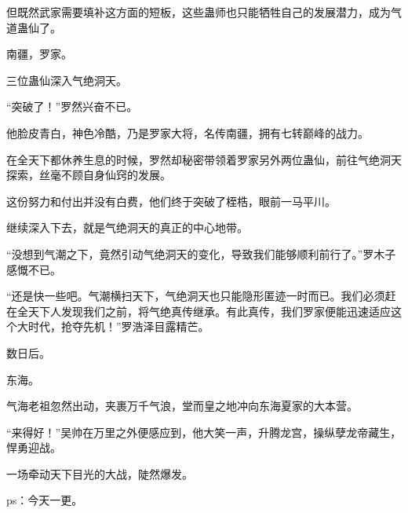 \begin{this_body}
但既然武家需要填补这方面的短板，这些蛊师也只能牺牲自己的发展潜力，成为气道蛊仙了。

南疆，罗家。

三位蛊仙深入气绝洞天。

“突破了！”罗然兴奋不已。

他脸皮青白，神色冷酷，乃是罗家大将，名传南疆，拥有七转巅峰的战力。

在全天下都休养生息的时候，罗然却秘密带领着罗家另外两位蛊仙，前往气绝洞天探索，丝毫不顾自身仙窍的发展。

这份努力和付出并没有白费，他们终于突破了桎梏，眼前一马平川。

继续深入下去，就是气绝洞天的真正的中心地带。

“没想到气潮之下，竟然引动气绝洞天的变化，导致我们能够顺利前行了。”罗木子感慨不已。

“还是快一些吧。气潮横扫天下，气绝洞天也只能隐形匿迹一时而已。我们必须赶在全天下人发现我们之前，将气绝真传继承。有此真传，我们罗家便能迅速适应这个大时代，抢夺先机！”罗浩泽目露精芒。

数日后。

东海。

气海老祖忽然出动，夹裹万千气浪，堂而皇之地冲向东海夏家的大本营。

“来得好！”吴帅在万里之外便感应到，他大笑一声，升腾龙宫，操纵孽龙帝藏生，悍勇迎战。

一场牵动天下目光的大战，陡然爆发。

ps：今天一更。

\end{this_body}

